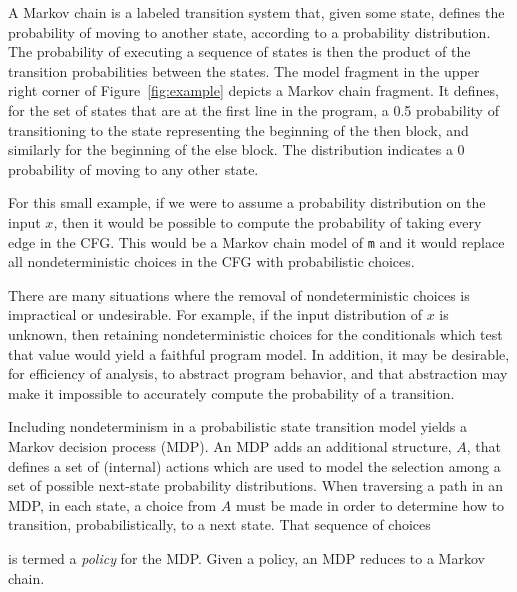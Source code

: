 A Markov chain is a labeled transition system that, given some
state, defines the probability of moving to another state, according 
to a probability distribution.
The probability of executing a sequence of states is then the
product of the transition probabilities between the states.
The model fragment in the upper right corner of 
Figure~\ref{fig:example} depicts a Markov chain fragment.
It defines, for the set of states 
that are at the first line in the program, 
a 0.5 probability of transitioning to 
the state representing the beginning of the then block,
and similarly for the beginning of the else block.  The
distribution indicates a 0 probability of moving to any
other state.

For this small example, if we were to assume a probability
distribution on the input $x$, then it would be possible
to compute the probability of taking every edge in the CFG.   
This would be a Markov chain model of {\tt m} and it would replace
all nondeterministic choices in the CFG with probabilistic choices.

There are many situations where the removal of nondeterministic
choices is impractical or undesirable.  For example, if the input
distribution of $x$ is unknown, then retaining nondeterministic
choices for the conditionals which test that value would yield a
faithful program model.  In addition, it may be desirable, for
efficiency of analysis, to abstract program behavior, and that
abstraction may make it impossible to accurately compute the 
probability of a transition.  

Including nondeterminism in a probabilistic state
transition model yields a Markov decision process (MDP).
An MDP adds an additional structure, $A$, that defines
a set of (internal) actions which are used to model the
selection among a set of possible next-state probability distributions.
When traversing a path in an MDP, in each state, a choice
from $A$ must be made in order to determine how to transition,
probabilistically, to a next state.   That sequence of choices
 is termed a \textit{policy} for the MDP.
Given a policy, an MDP reduces to a Markov chain.
